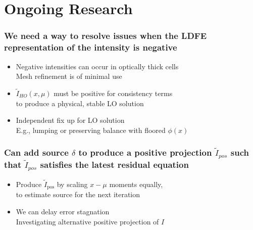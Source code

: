 \documentclass[xcolor=dvipsnames,hyperref={pdfpagelabels=false},unknownkeysallowed,
handout]{beamer}
\newcommand{\colb}[1]{{\color{blue} #1}}
\newcommand{\colG}[1]{{\color{Gray!110} #1}}
\newlength{\wideitemsep}
\let\olditem\item
\renewcommand{\item}{\setlength{\itemsep}{\wideitemsep}\olditem}
\newcommand{\B}[1]{\ensuremath{\mathbf{#1}}}
\begin{document}
\section{Ongoing Research}

\begin{frame}
    \frametitle{We need a way to resolve issues when the LDFE representation of the intensity is
        negative}
    {\addtolength\wideitemsep{5pt}
    \begin{itemize}
        \item[] Negative intensities can occur in optically thick cells \\
            \colG{Mesh refinement is of minimal use}
        \item[] $\tilde I_{HO}(x,\mu)$ must be positive for consistency terms \\
            \colG{to produce a physical, stable LO solution}
         \item[] Independent fix up for LO solution
             \colG{\\E.g., lumping or preserving balance with floored $\phi(x)$}
    \end{itemize}
}

\end{frame}

\begin{frame}
    \frametitle{Can add source $\delta$ to produce a positive projection $\tilde I_{pos}$ 
        such that $\tilde I_{pos}$ satisfies the
    latest residual equation}
    {\addtolength\wideitemsep{0.1in}
    \begin{itemize} 
        \item[] Produce $\tilde I_{\text{pos}}$ by scaling $x-\mu$ moments equally,
            \\ \colG{to estimate source for the next iteration\vspace{0.1in}}
        \item[] We can delay error stagnation
            \\ \colG{Investigating alternative positive projection of $I$}
    \end{itemize}
}
\end{frame}
\end{document}
